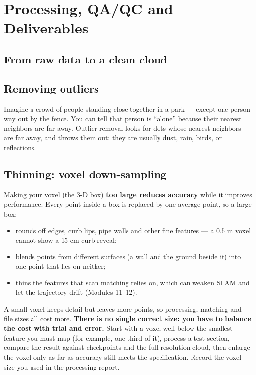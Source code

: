 \chapter{Processing, QA/QC and Deliverables}

\section{From raw data to a clean cloud}


\section{Removing outliers}

\begin{kid}
Imagine a crowd of people standing close together in a park --- except one person way out by the fence. You can tell that person is ``alone'' because their nearest neighbors are far away. Outlier removal looks for dots whose nearest neighbors are far away, and throws them out: they are usually dust, rain, birds, or reflections.
\end{kid}


\section{Thinning: voxel down-sampling}


\begin{warning}[title={WARNING --- voxel size trades accuracy for speed}]
Making your voxel (the 3-D box) \textbf{too large reduces accuracy} while it improves performance. Every point inside a box is replaced by one average point, so a large box:
\begin{itemize}
\item rounds off edges, curb lips, pipe walls and other fine features --- a 0.5 m voxel cannot show a 15 cm curb reveal;
\item blends points from different surfaces (a wall and the ground beside it) into one point that lies on neither;
\item thins the features that scan matching relies on, which can weaken SLAM and let the trajectory drift (Modules 11--12).
\end{itemize}
A small voxel keeps detail but leaves more points, so processing, matching and file sizes all cost more. \textbf{There is no single correct size: you have to balance the cost with trial and error.} Start with a voxel well below the smallest feature you must map (for example, one-third of it), process a test section, compare the result against checkpoints and the full-resolution cloud, then enlarge the voxel only as far as accuracy still meets the specification. Record the voxel size you used in the processing report.
\end{warning}

